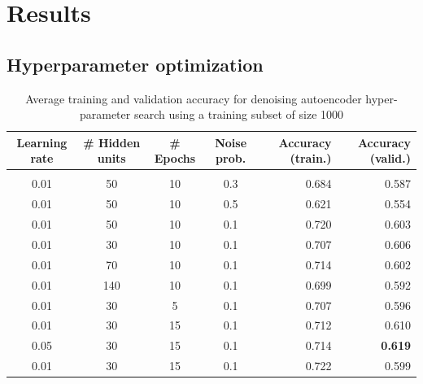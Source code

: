 \documentclass{article} %
\begin{document}
\section{Results}
\subsection{Hyperparameter optimization}
\begin{table}[h]
\caption{Average training and validation accuracy for denoising autoencoder hyper-parameter
 search using a training subset of size 1000}
\label{results-table}
\begin{center}
\begin{adjustbox}{width=1\textwidth}
\begin{tabular}{cccc|rr}

\multicolumn{1}{c}{\bf Learning rate}  
&\multicolumn{1}{c}{\bf \# Hidden units}  
&\multicolumn{1}{c}{\bf \# Epochs} 
&\multicolumn{1}{c}{\bf Noise prob.} 
&\multicolumn{1}{|r}{\bf Accuracy (train.)}
&\multicolumn{1}{r}{\bf Accuracy (valid.)}
\\ \hline \\	
0.01 & 50 & 10 & 0.3 & 0.684 & 0.587 \\
0.01 & 50 & 10 & 0.5 & 0.621 & 0.554 \\
0.01 & 50 & 10 & 0.1 & 0.720 & 0.603 \\
0.01 & 30 & 10 & 0.1 & 0.707 & 0.606 \\
0.01 & 70 & 10 & 0.1 & 0.714 & 0.602 \\
0.01 & 140 & 10 & 0.1 & 0.699 & 0.592 \\
0.01 & 30 & 5 & 0.1 & 0.707 & 0.596 \\
0.01 & 30 & 15 & 0.1 & 0.712 & 0.610 \\
0.05 & 30 & 15 & 0.1 & 0.714 & \textbf{0.619} \\
0.01 & 30 & 15 & 0.1 & 0.722 & 0.599 \\

\end{tabular}
\end{adjustbox}
\end{center}
\end{table}
\end{document}
